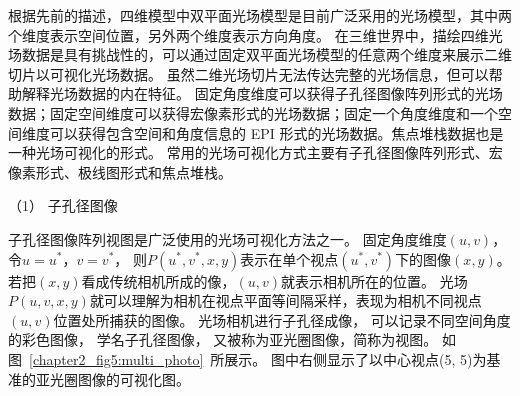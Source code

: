 %
%
%






根据先前的描述，四维模型中双平面光场模型是目前广泛采用的光场模型，其中两个维度表示空间位置，另外两个维度表示方向角度。
在三维世界中，描绘四维光场数据是具有挑战性的，可以通过固定双平面光场模型的任意两个维度来展示二维切片以可视化光场数据。
虽然二维光场切片无法传达完整的光场信息，但可以帮助解释光场数据的内在特征。
固定角度维度可以获得子孔径图像阵列形式的光场数据；固定空间维度可以获得宏像素形式的光场数据；固定一个角度维度和一个空间维度可以获得包含空间和角度信息的 EPI 形式的光场数据。焦点堆栈数据也是一种光场可视化的形式。
常用的光场可视化方式主要有子孔径图像阵列形式、宏像素形式、极线图形式和焦点堆栈。








（1）
子孔径图像







子孔径图像阵列视图是广泛使用的光场可视化方法之一。
固定角度维度$(u, v)$，令$u = u^{*}$，$ v = v^{*} $，
则$P(u^{*}, v^{*}, x, y) $表示在单个视点$(u^{*}, v^{*})$下的图像$(x,y)$。
若把$(x,y)$看成传统相机所成的像，$(u, v)$就表示相机所在的位置。
光场$P(u, v, x, y)$就可以理解为相机在视点平面等间隔采样，表现为相机不同视点$(u, v)$位置处所捕获的图像。
光场相机进行子孔径成像，
可以记录不同空间角度的彩色图像，
学名子孔径图像，
又被称为亚光圈图像，简称为视图。
如图~\ref{chapter2_fig5:multi_photo}~所展示。
图中右侧显示了以中心视点(5, 5)为基准的亚光圈图像的可视化图。




